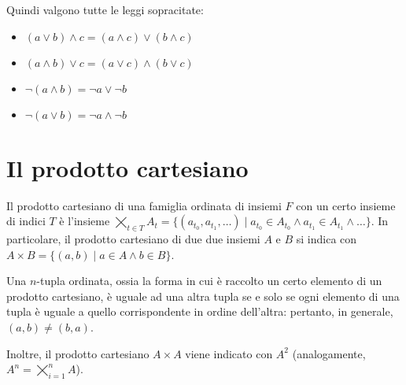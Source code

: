 Quindi valgono tutte le leggi sopracitate:

\begin{itemize}
    \item $(a \lor b) \land c = (a \land c) \lor (b \land c)$
    \item $(a \land b) \lor c = (a \lor c) \land (b \lor c)$
    \item $\lnot (a \land b) = \lnot a \lor \lnot b$
    \item $\lnot (a \lor b) = \lnot a \land \lnot b$
\end{itemize}

\section{Il prodotto cartesiano}

Il prodotto cartesiano di una famiglia ordinata di insiemi $F$ con un certo insieme
di indici $T$ è l'insieme
$\bigtimes_{t \in T} A_t = \{(a_{t_0}, a_{t_1}, \ldots) \mid a_{t_0} \in A_{t_0} \land
    a_{t_1} \in A_{t_1} \land \ldots\}$. In particolare, il prodotto cartesiano di
due due insiemi $A$ e $B$ si indica con $A \times B = \{(a, b) \mid a \in A \land b \in B\}$.

Una $n$-tupla ordinata, ossia la forma in cui è raccolto un certo elemento di un prodotto cartesiano,
è uguale ad una altra tupla se e solo se ogni elemento di una tupla è uguale a quello
corrispondente in ordine dell'altra: pertanto, in generale, $(a, b) \neq (b, a)$.

Inoltre, il prodotto cartesiano $A \times A$ viene indicato con $A^2$ (analogamente,
$A^n = \bigtimes_{i=1}^{n} A$).
